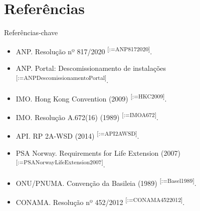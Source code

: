 \documentclass[aspectratio=169,11pt]{beamer}
\makeatletter
\renewcommand{\cite}[1]{\textsuperscript{[\@for\@tempa:=#1\do{\@tempa,}\@gobble]}}
\makeatother
\begin{document}
\section{Referências}

\begin{frame}{Referências-chave}
\footnotesize
\begin{itemize}
  \item ANP. Resolução nº 817/2020 \cite{ANP8172020}.
  \item ANP. Portal: Descomissionamento de instalações \cite{ANPDescomissionamentoPortal}.
  \item IMO. Hong Kong Convention (2009) \cite{HKC2009}.
  \item IMO. Resolução A.672(16) (1989) \cite{IMOA672}.
  \item API. RP 2A-WSD (2014) \cite{API2AWSD}.
  \item PSA Norway. Requirements for Life Extension (2007) \cite{PSANorwayLifeExtension2007}.
  \item ONU/PNUMA. Convenção da Basileia (1989) \cite{Basel1989}.
  \item CONAMA. Resolução nº 452/2012 \cite{CONAMA4522012}.
\end{itemize}
\end{frame}
\end{document}
